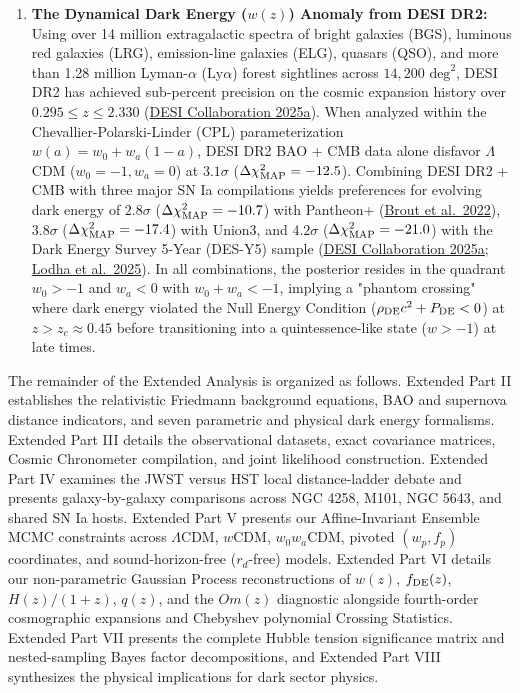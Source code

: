 \documentclass[aps,prd,preprint,superscriptaddress,nofootinbib]{revtex4-2}
\begin{document}
\begin{enumerate}
    \item \textbf{The Dynamical Dark Energy ($w(z)$) Anomaly from DESI DR2:} Using over 14 million extragalactic spectra of bright galaxies (BGS), luminous red galaxies (LRG), emission-line galaxies (ELG), quasars (QSO), and more than 1.28 million Lyman-$\alpha$ ($\text{Ly}\alpha$) forest sightlines across $14,200\text{ deg}^2$, DESI DR2 has achieved sub-percent precision on the cosmic expansion history over $0.295 \le z \le 2.330$ (\href{https://arxiv.org/abs/2503.14738}{DESI Collaboration 2025a}). When analyzed within the Chevallier-Polarski-Linder (CPL) parameterization $w(a) = w_0 + w_a(1-a)$, DESI DR2 BAO + CMB data alone disfavor $\Lambda$CDM ($w_0=-1, w_a=0$) at $3.1\sigma$ ($\Delta\chi^2_{\rm MAP} = -12.5$). Combining DESI DR2 + CMB with three major SN Ia compilations yields preferences for evolving dark energy of $2.8\sigma$ ($\Delta\chi^2_{\rm MAP} = -10.7$) with Pantheon+ (\href{https://arxiv.org/abs/2202.04077}{Brout et al.\ 2022}), $3.8\sigma$ ($\Delta\chi^2_{\rm MAP} = -17.4$) with Union3, and $4.2\sigma$ ($\Delta\chi^2_{\rm MAP} = -21.0$) with the Dark Energy Survey 5-Year (DES-Y5) sample (\href{https://arxiv.org/abs/2503.14738}{DESI Collaboration 2025a}; \href{https://arxiv.org/abs/2503.14743}{Lodha et al.\ 2025}). In all combinations, the posterior resides in the quadrant $w_0 > -1$ and $w_a < 0$ with $w_0 + w_a < -1$, implying a "phantom crossing" where dark energy violated the Null Energy Condition ($\rho_{\rm DE} c^2 + P_{\rm DE} < 0$) at $z > z_c \approx 0.45$ before transitioning into a quintessence-like state ($w > -1$) at late times.
\end{enumerate}

The remainder of the Extended Analysis is organized as follows. Extended Part II establishes the relativistic Friedmann background equations, BAO and supernova distance indicators, and seven parametric and physical dark energy formalisms. Extended Part III details the observational datasets, exact covariance matrices, Cosmic Chronometer compilation, and joint likelihood construction. Extended Part IV examines the JWST versus HST local distance-ladder debate and presents galaxy-by-galaxy comparisons across NGC 4258, M101, NGC 5643, and shared SN Ia hosts. Extended Part V presents our Affine-Invariant Ensemble MCMC constraints across $\Lambda$CDM, $w$CDM, $w_0 w_a$CDM, pivoted $(w_p, f_p)$ coordinates, and sound-horizon-free ($r_d$-free) models. Extended Part VI details our non-parametric Gaussian Process reconstructions of $w(z)$, $f_{\rm DE}(z)$, $H(z)/(1+z)$, $q(z)$, and the $Om(z)$ diagnostic alongside fourth-order cosmographic expansions and Chebyshev polynomial Crossing Statistics. Extended Part VII presents the complete Hubble tension significance matrix and nested-sampling Bayes factor decompositions, and Extended Part VIII synthesizes the physical implications for dark sector physics.
\end{document}
